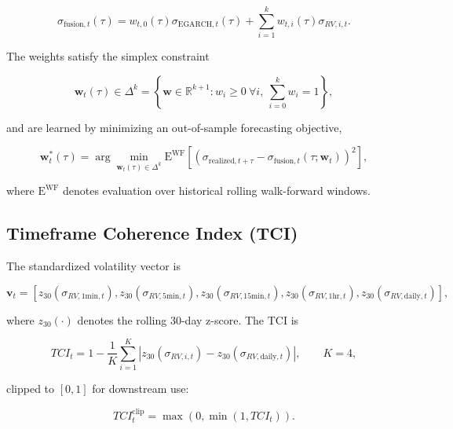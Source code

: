 \documentclass[journal]{IEEEtran}
\begin{document}
\begin{equation}
\label{eq:adaptive_fusion}
\sigma_{\mathrm{fusion},t}(\tau) = w_{t,0}(\tau)\sigma_{\mathrm{EGARCH},t}(\tau)
+ \sum_{i=1}^{k} w_{t,i}(\tau)\sigma_{RV,i,t}.
\end{equation}

The weights satisfy the simplex constraint

\begin{equation}
\label{eq:fusion_simplex}
\mathbf{w}_t(\tau) \in \Delta^{k}
= \!\left\{\mathbf{w}\in\mathbb{R}^{k+1}: w_i\geq 0\ \forall i,\
\sum_{i=0}^{k}w_i=1\right\},
\end{equation}

and are learned by minimizing an out-of-sample forecasting objective,

\begin{equation}
\label{eq:fusion_objective}
\mathbf{w}^{*}_t(\tau) = \arg\min_{\mathbf{w}_t(\tau)\in\Delta^{k}}
\mathrm{E}^{\mathrm{WF}}\!\left[\!\left(\sigma_{\mathrm{realized},t+\tau}
- \sigma_{\mathrm{fusion},t}(\tau;\mathbf{w}_t)\right)^{\!2}\right],
\end{equation}

where $\mathrm{E}^{\mathrm{WF}}$ denotes evaluation over historical
rolling walk-forward windows.

\subsection{Timeframe Coherence Index (TCI)}

The standardized volatility vector is

\begin{equation}
\label{eq:tci_vector}
\mathbf{v}_t = \left[z_{30}(\sigma_{RV,1\text{min},t}),
z_{30}(\sigma_{RV,5\text{min},t}),
z_{30}(\sigma_{RV,15\text{min},t}),
z_{30}(\sigma_{RV,1\text{hr},t}),
z_{30}(\sigma_{RV,\text{daily},t})\right],
\end{equation}

where $z_{30}(\cdot)$ denotes the rolling 30-day z-score. The TCI is

\begin{equation}
\label{eq:tci}
TCI_t = 1 - \frac{1}{K}\sum_{i=1}^{K}
\left|z_{30}(\sigma_{RV,i,t}) - z_{30}(\sigma_{RV,\text{daily},t})\right|,
\qquad K=4,
\end{equation}

clipped to $[0,1]$ for downstream use:

\begin{equation}
\label{eq:tci_clipped}
TCI^{\mathrm{clip}}_t = \max\!\left(0,\min\!\left(1,TCI_t\right)\right).
\end{equation}
\end{document}
